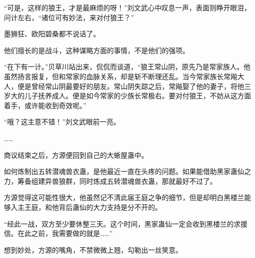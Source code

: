 \begin{this_body}
“可是，这样的狼王，才是最麻烦的呀！”刘文武心中叹息一声，表面则睁开眼泪，问计左右，“诸位可有妙法，来对付狼王？”

墨狮狂、欧阳碧桑都不说话了。

他们擅长的是战斗，这种谋略方面的事情，不是他们的强项。

“在下有一计。”贝草川站出来，侃侃而谈道，“狼王常山阴，原先乃是常家族人。他虽然扬言报复，但和常家的血脉关系，却是斩不断理还乱。当今常家族长常飚大人，便是曾经常山阴最要好的朋友。常山阴失踪之后，常飚娶了他的妻子，将他三岁大的儿子抚养成人。便是如今常家的少族长常极右。要对付狼王，不妨从这方面着手，或许能收到奇效呢。”

“哦？这主意不错！”刘文武眼前一亮。

……

商议结束之后，方源便回到自己的大蜥屋蛊中。

如何炼制出五转潜魂兽衣蛊，是他最近一直在头疼的问题。如果能借助黑家蛊仙之力，筹备组建异兽狼群，同时炼成五转潜魂兽衣蛊，那就最好不过了。

方源觉得这可能性很大，他虽然记不清此届王庭之争的细节，但是却明白黑楼兰能够入主王庭，和他背后蛊仙的大力支持是分不开的。

“经此一战，双方至少要休整三天。这个时间，黑家蛊仙一定会收到黑楼兰的求援信。在此之前，我需要做的就是……”

想到妙处，方源的嘴角，不禁微微上翘，勾勒出一丝笑意。

\end{this_body}

